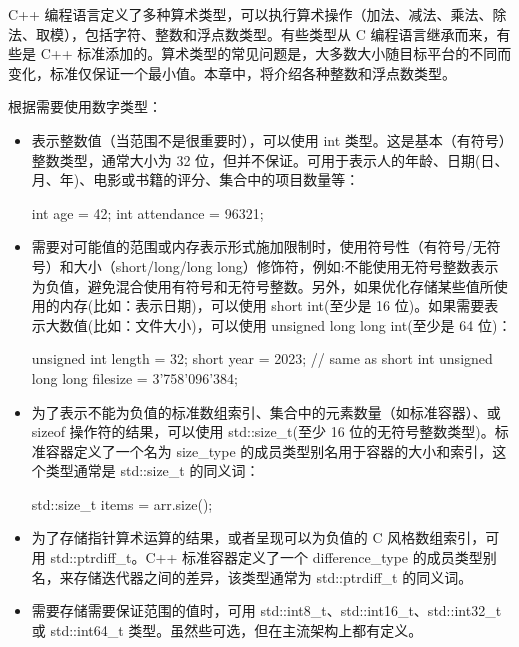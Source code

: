 
C++ 编程语言定义了多种算术类型，可以执行算术操作（加法、减法、乘法、除法、取模），包括字符、整数和浮点数类型。有些类型从 C 编程语言继承而来，有些是 C++ 标准添加的。算术类型的常见问题是，大多数大小随目标平台的不同而变化，标准仅保证一个最小值。本章中，将介绍各种整数和浮点数类型。


根据需要使用数字类型：

\begin{itemize}
\item
表示整数值（当范围不是很重要时），可以使用 int 类型。这是基本（有符号）整数类型，通常大小为 32 位，但并不保证。可用于表示人的年龄、日期(日、月、年)、电影或书籍的评分、集合中的项目数量等：

\begin{cpp}
int age = 42;
int attendance = 96321;
\end{cpp}

\item
需要对可能值的范围或内存表示形式施加限制时，使用符号性（有符号/无符号）和大小（short/long/long long）修饰符，例如:不能使用无符号整数表示为负值，避免混合使用有符号和无符号整数。另外，如果优化存储某些值所使用的内存(比如：表示日期)，可以使用 short int(至少是 16 位)。如果需要表示大数值(比如：文件大小)，可以使用 unsigned long long int(至少是 64 位)：

\begin{cpp}
unsigned int length = 32;
short year = 2023; // same as short int
unsigned long long filesize = 3'758'096'384;
\end{cpp}

\item
为了表示不能为负值的标准数组索引、集合中的元素数量（如标准容器）、或 sizeof 操作符的结果，可以使用 std::size\_t(至少 16 位的无符号整数类型)。标准容器定义了一个名为 size\_type 的成员类型别名用于容器的大小和索引，这个类型通常是 std::size\_t 的同义词：

\begin{cpp}
std::size_t items = arr.size();
\end{cpp}

\item
为了存储指针算术运算的结果，或者呈现可以为负值的 C 风格数组索引，可用 std::ptrdiff\_t。C++ 标准容器定义了一个 difference\_type 的成员类型别名，来存储迭代器之间的差异，该类型通常为 std::ptrdiff\_t 的同义词。

\item
需要存储需要保证范围的值时，可用 std::int8\_t、std::int16\_t、std::int32\_t 或 std::int64\_t 类型。虽然些可选，但在主流架构上都有定义。


\end{itemize}
